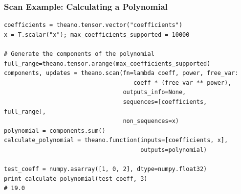 \documentclass[a4paper,9pt]{beamer}
\begin{document}
\begin{frame}[fragile]
\frametitle{Scan Example: Calculating a Polynomial}
\begin{Verbatim}
coefficients = theano.tensor.vector("coefficients")
x = T.scalar("x"); max_coefficients_supported = 10000

# Generate the components of the polynomial
full_range=theano.tensor.arange(max_coefficients_supported)
components, updates = theano.scan(fn=lambda coeff, power, free_var: 
                                     coeff * (free_var ** power),
                                  outputs_info=None,
                                  sequences=[coefficients, full_range],
                                  non_sequences=x)
polynomial = components.sum()
calculate_polynomial = theano.function(inputs=[coefficients, x],
                                       outputs=polynomial)

test_coeff = numpy.asarray([1, 0, 2], dtype=numpy.float32)
print calculate_polynomial(test_coeff, 3)
# 19.0
\end{Verbatim}
\end{frame}
\end{document}
